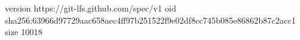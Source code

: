 version https://git-lfs.github.com/spec/v1
oid sha256:63966d97729aac658aec4ff97b251522f9e02df8cc745b085e86862b87c2acc1
size 10018
